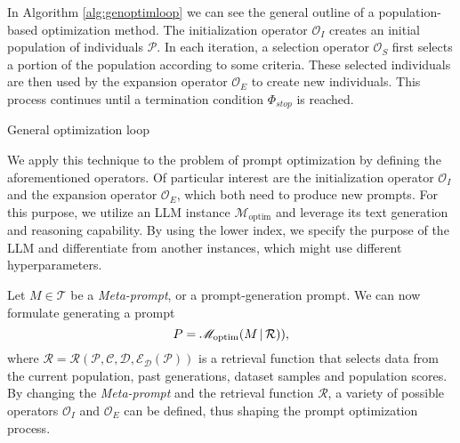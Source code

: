 In Algorithm \ref{alg:genoptimloop} we can see the general outline of a population-based optimization method.
The initialization operator $\mathscr{O}_I$ creates an initial population of individuals $\mathcal{P}$. 
In each iteration, a selection operator $\mathscr{O}_S$ first selects a portion of the population according to some criteria. 
These selected individuals are then used by the expansion operator $\mathscr{O}_E$ to create new individuals.
This process continues until a termination condition $\Phi_{stop}$ is reached.

\begin{algorithm}
    \caption{General optimization loop}
    \label{alg:genoptimloop}
     
         
    \end{algorithm}
    
We apply this technique to the problem of prompt optimization by defining the aforementioned operators.
Of particular interest are the initialization operator $\mathscr{O}_I$ and the expansion operator $\mathscr{O}_E$, which
both need to produce new prompts. For this purpose, we utilize an LLM instance $\mathscr{M}_{\text{optim}}$ and leverage its 
text generation and reasoning capability. By using the lower index, we specify the purpose of the LLM and differentiate 
from another instances, which might use different hyperparameters.

Let $M\in\mathcal{T}$ be a \textit{Meta-prompt}, or a prompt-generation prompt. We can now formulate generating a prompt 
\begin{equation}
    P = \mathscr{M}_{\text{optim}}(M\, \vert \, \mathcal{R})),
\end{equation}
where $\mathcal{R} = \mathcal{R}(\mathcal{P}, \mathcal{C}, \mathcal{D}, \mathcal{E}_{\mathcal{D}}(\mathcal{P}))$ is a retrieval function that selects data
from the current population, past generations, dataset samples and population scores. 
By changing the \textit{Meta-prompt} and the retrieval function $\mathcal{R}$, a variety of possible operators $\mathscr{O}_I$ and $\mathscr{O}_E$
can be defined, thus shaping the prompt optimization process.  

